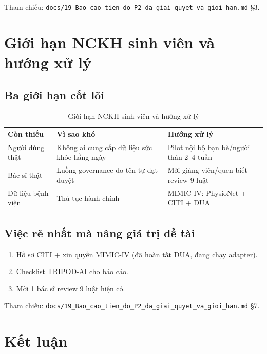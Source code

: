 \documentclass[13pt,a4paper]{article}
\begin{document}
Tham chiếu: \texttt{docs/19\_Bao\_cao\_tien\_do\_P2\_da\_giai\_quyet\_va\_gioi\_han.md} §3.

\section{Giới hạn NCKH sinh viên và hướng xử lý}

\subsection{Ba giới hạn cốt lõi}

\begin{table}[H]
\centering
\caption{Giới hạn NCKH sinh viên và hướng xử lý}
\label{tab:student_limits}
\begin{tabular}{>{\raggedright\arraybackslash}p{2.5cm}>{\raggedright\arraybackslash}p{4.5cm}>{\raggedright\arraybackslash}p{5.5cm}}
\toprule
Còn thiếu & Vì sao khó & Hướng xử lý \\
\midrule
Người dùng thật & Không ai cung cấp dữ liệu sức khỏe hằng ngày & Pilot nội bộ bạn bè/người thân 2--4 tuần \\
Bác sĩ thật & Luồng governance do tên tự đặt duyệt & Mời giảng viên/quen biết review 9 luật \\
Dữ liệu bệnh viện & Thủ tục hành chính & MIMIC-IV: PhysioNet + CITI + DUA \\
\bottomrule
\end{tabular}
\end{table}

\subsection{Việc rẻ nhất mà nâng giá trị đề tài}

\begin{enumerate}
    \item Hồ sơ CITI + xin quyền MIMIC-IV (đã hoàn tất DUA, đang chạy adapter).
    \item Checklist TRIPOD-AI cho báo cáo.
    \item Mời 1 bác sĩ review 9 luật hiện có.
\end{enumerate}

Tham chiếu: \texttt{docs/19\_Bao\_cao\_tien\_do\_P2\_da\_giai\_quyet\_va\_gioi\_han.md} §7.

\section{Kết luận}
\end{document}
